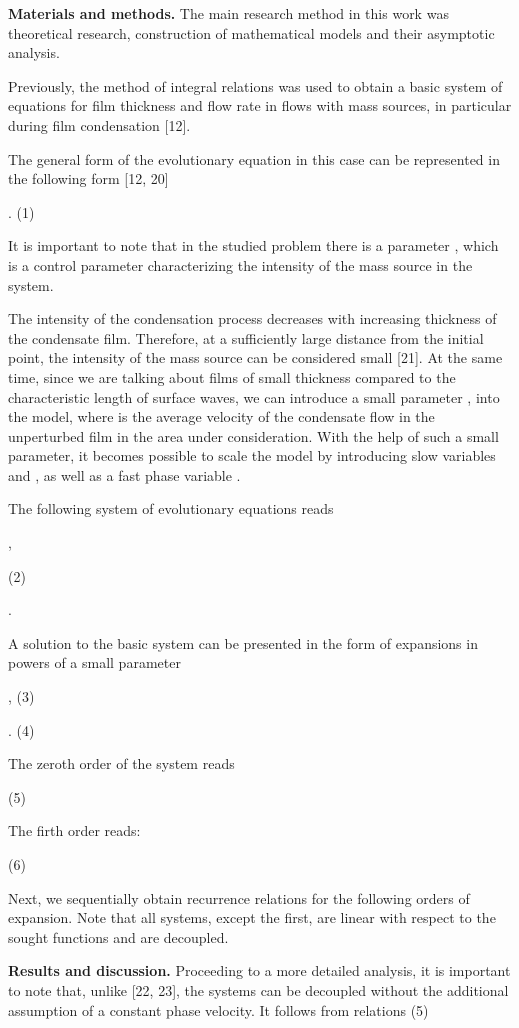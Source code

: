 \begin{multicols}{2}
{\bfseries Materials and methods.} The main research method in this work
was theoretical research, construction of mathematical models and their
asymptotic analysis.

Previously, the method of integral relations was used to obtain a basic
system of equations for film thickness and flow rate in flows with mass
sources, in particular during film condensation {[}12{]}.

The general form of the evolutionary equation in this case can be
represented in the following form {[}12, 20{]}

.
(1)

It is important to note that in the studied problem there is a parameter
,
which is a control parameter characterizing the intensity of the mass
source in the system.

The intensity of the condensation process decreases with increasing
thickness of the condensate film. Therefore, at a sufficiently large
distance from the initial point, the intensity of the mass source can be
considered small {[}21{]}. At the same time, since we are talking about
films of small thickness compared to the characteristic length of
surface waves, we can introduce a small parameter
,
into the model, where is the average velocity of the condensate flow in
the unperturbed film in the area under consideration. With the help of
such a small parameter, it becomes possible to scale the model by
introducing slow variables
and
, as
well as a fast phase variable
.

The following system of evolutionary equations reads



,

(2)

.

A solution to the basic system can be presented in the form of
expansions in powers of a small parameter

,
(3)

.
(4)

The zeroth order of the system reads



(5)

The firth order reads:

(6)

Next, we sequentially obtain recurrence relations for the following
orders of expansion. Note that all systems, except the first, are linear
with respect to the sought functions and are decoupled.

{\bfseries Results and discussion.} Proceeding to a more detailed analysis,
it is important to note that, unlike {[}22, 23{]}, the systems can be
decoupled without the additional assumption of a constant phase
velocity. It follows from relations (5)


\end{multicols}
